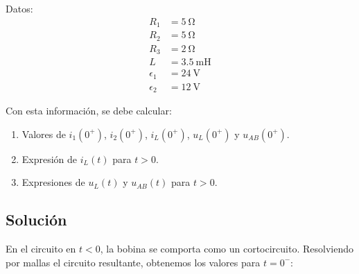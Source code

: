 \begin{minipage}{0.5\linewidth}
\end{minipage}
\begin{minipage}{0.5\linewidth}
  \hspace{20mm} Datos:
  \begin{align*}
    R_1 &= \SI{5}{\ohm}\\
    R_2 &= \SI{5}{\ohm}\\
    R_3 &= \SI{2}{\ohm}\\
    L &= \SI{3.5}{\milli\henry}\\
    \epsilon_1 &= \SI{24}{\volt}\\
    \epsilon_2 &= \SI{12}{\volt}
  \end{align*}
\end{minipage}

\medskip

Con esta información, se debe calcular:
\begin{enumerate}
\item Valores de $i_1(0^+)$, $i_2(0^+)$, $i_L(0^+)$, $u_L(0^+)$ y
  $u_{AB}(0^+)$.
\item Expresión de $i_L(t)$ para $t > 0$.
\item Expresiones de $u_L(t)$ y $u_{AB}(t)$ para $t > 0$.
\end{enumerate}

\subsection*{Solución}

En el circuito en $t <0$, la bobina se comporta como un
cortocircuito. Resolviendo por mallas el circuito resultante, obtenemos
los valores para $t = 0^-$:

